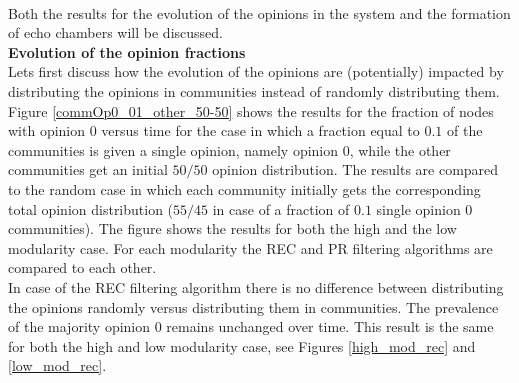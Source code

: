 \documentclass[11 pt , letterpaper , twoside , openright]{book}
\begin{document}
\\
Both the results for the evolution of the opinions in the system and the formation of echo chambers will be discussed.\\
\newpage
\noindent
\textbf{Evolution of the opinion fractions}\\
\newline
Lets first discuss how the evolution of the opinions are (potentially) impacted by distributing the opinions in communities instead of randomly distributing them.\\
\newline
Figure \ref{commOp0_01_other_50-50} shows the results for the fraction of nodes with opinion 0 versus time for the case in which a fraction equal to $0.1$ of the communities is given a single opinion, namely opinion 0, while the other communities get an initial $50/50$ opinion distribution. The results are compared to the random case in which each community initially gets the corresponding total opinion distribution ($55/45$ in case of a fraction of $0.1$ single opinion 0 communities). The figure shows the results for both the high and the low modularity case. For each modularity the REC and PR filtering algorithms are compared to each other.\\
In case of the REC filtering algorithm there is no difference between distributing the opinions randomly versus distributing them in communities. The prevalence of the majority opinion 0 remains unchanged over time. This result is the same for both the high and low modularity case, see Figures \ref{high_mod_rec} and \ref{low_mod_rec}.\\
\end{document}
